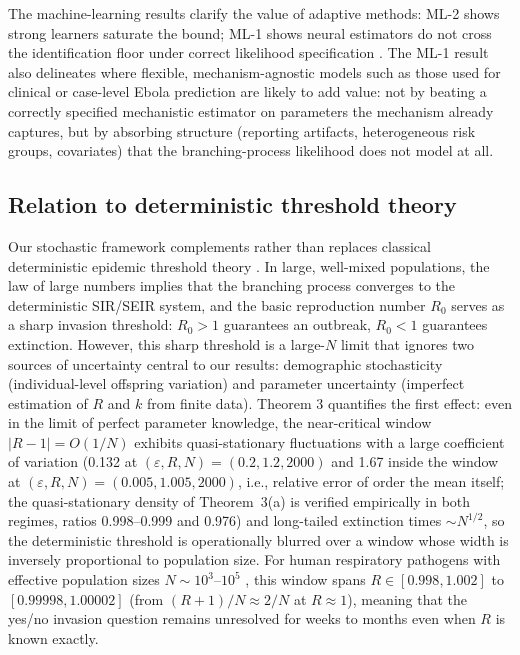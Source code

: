 \documentclass[review]{elsarticle}
\theoremstyle{plain}
\theoremstyle{definition}
\begin{document}
The machine-learning results clarify the value of adaptive methods: ML-2 shows strong learners saturate the bound; ML-1 shows neural estimators do not cross the identification floor under correct likelihood specification \citep{lehmann1998theory}. The ML-1 result also delineates where flexible, mechanism-agnostic models such as those used for clinical or case-level Ebola prediction \citep{colubri2019machine} are likely to add value: not by beating a correctly specified mechanistic estimator on parameters the mechanism already captures, but by absorbing structure (reporting artifacts, heterogeneous risk groups, covariates) that the branching-process likelihood does not model at all.

\subsection{Relation to deterministic threshold theory}

Our stochastic framework complements rather than replaces classical deterministic epidemic threshold theory \citep{kermack1927contribution, anderson1991infectious}. In large, well-mixed populations, the law of large numbers implies that the branching process converges to the deterministic SIR/SEIR system, and the basic reproduction number $R_0$ serves as a sharp invasion threshold: $R_0 > 1$ guarantees an outbreak, $R_0 < 1$ guarantees extinction. However, this sharp threshold is a large-$N$ limit that ignores two sources of uncertainty central to our results: demographic stochasticity (individual-level offspring variation) and parameter uncertainty (imperfect estimation of $R$ and $k$ from finite data). Theorem 3 quantifies the first effect: even in the limit of perfect parameter knowledge, the near-critical window $|R - 1| = O(1/N)$ exhibits quasi-stationary fluctuations with a large coefficient of variation (0.132 at $(\varepsilon,R,N)=(0.2,1.2,2000)$ and 1.67 inside the window at $(\varepsilon,R,N)=(0.005,1.005,2000)$, i.e., relative error of order the mean itself; the quasi-stationary density of Theorem~3(a) is verified empirically in both regimes, ratios 0.998--0.999 and 0.976) and long-tailed extinction times $\sim N^{1/2}$, so the deterministic threshold is operationally blurred over a window whose width is inversely proportional to population size. For human respiratory pathogens with effective population sizes $N \sim 10^3$--$10^5$ \citep{ethier1986markov, bettencourt2008real}, this window spans $R \in [0.998, 1.002]$ to $[0.99998, 1.00002]$ (from $(R+1)/N \approx 2/N$ at $R \approx 1$), meaning that the yes/no invasion question remains unresolved for weeks to months even when $R$ is known exactly.
\end{document}
